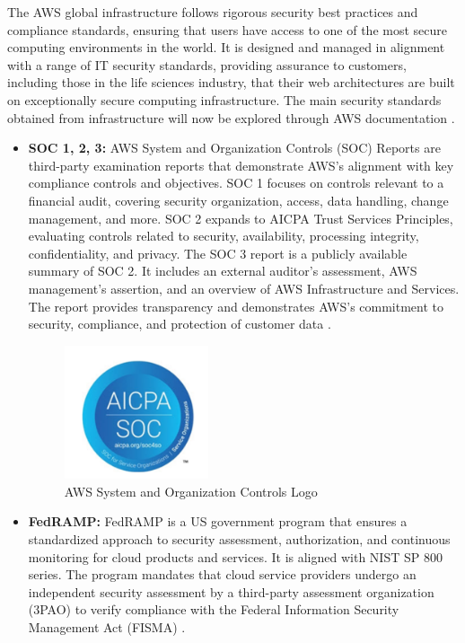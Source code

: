 The AWS global infrastructure follows rigorous security best practices and compliance standards, ensuring that users have access to one of the most secure computing environments in the world. It is designed and managed in alignment with a range of IT security standards, providing assurance to customers, including those in the life sciences industry, that their web architectures are built on exceptionally secure computing infrastructure. The main security standards obtained from infrastructure will now be explored through AWS documentation \cite{AWSCertificationsAndAttestations}. 
\begin{itemize}
    \item \textbf{SOC 1, 2, 3: }  AWS System and Organization Controls (SOC) Reports are third-party examination reports that demonstrate AWS's alignment with key compliance controls and objectives. SOC 1 focuses on controls relevant to a financial audit, covering security organization, access, data handling, change management, and more. SOC 2 expands to AICPA Trust Services Principles, evaluating controls related to security, availability, processing integrity, confidentiality, and privacy. The SOC 3 report is a publicly available summary of SOC 2. It includes an external auditor's assessment, AWS management's assertion, and an overview of AWS Infrastructure and Services. The report provides transparency and demonstrates AWS's commitment to security, compliance, and protection of customer data \cite{AWSSOC3}.
    \begin{figure}[h]  %
        \centering
        \includegraphics[width=0.4\textwidth]{images/AWSSOC.png}  %
        \caption{AWS System and Organization Controls Logo}
        \label{fig:AWSSOC}
    \end{figure}
    \item \textbf{FedRAMP: } FedRAMP is a US government program that ensures a standardized approach to security assessment, authorization, and continuous monitoring for cloud products and services. It is aligned with NIST SP 800 series. The program mandates that cloud service providers undergo an independent security assessment by a third-party assessment organization (3PAO) to verify compliance with the  Federal Information Security Management Act (FISMA) \cite{Fedramp}.

\end{itemize}
